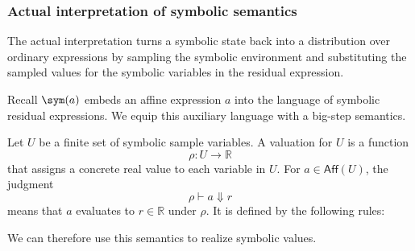 \subsubsection{Actual interpretation of symbolic semantics}

The actual interpretation turns a symbolic state back into a distribution over
ordinary expressions by sampling the symbolic environment and substituting the
sampled values for the symbolic variables in the residual expression.  


Recall $\sym(a)$ embeds an affine expression $a$ into the
language of symbolic residual expressions. We equip this auxiliary language
with a big-step semantics.

Let $U$ be a finite set of symbolic sample variables. A valuation for $U$
is a function
\[
  \rho : U \to \mathbb{R}
\]
that assigns a concrete real value to each variable in $U$. For
$a\in\mathsf{Aff}(U)$, the judgment
\[
  \rho \vdash a \Downarrow r
\]
means that $a$ evaluates to $r\in\mathbb{R}$ under $\rho$. It is defined
by the following rules:

We can therefore use this semantics to realize symbolic values. 

